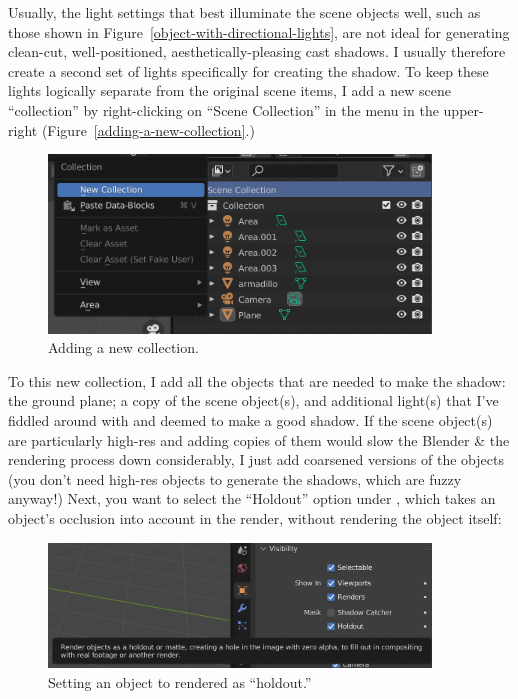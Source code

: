 \documentclass[10pt]{article}
\begin{document}
Usually, the light settings that best illuminate the scene objects well, such as those shown in Figure~\ref{object-with-directional-lights}, are not ideal for generating clean-cut, well-positioned, aesthetically-pleasing cast shadows. I usually therefore create a second set of lights specifically for creating the shadow. To keep these lights logically separate from the original scene items, I add a new scene ``collection'' by right-clicking on ``Scene Collection'' in the  menu in the upper-right (Figure~\ref{adding-a-new-collection}.)
\begin{figure}[H]
    \centering
    \includegraphics[width=4in]{images/adding-a-new-collection.png}
    \caption{Adding a new collection.}
    \label{fig:adding-a-new-collection}
\end{figure}
To this new collection, I add all the objects that are needed to make the shadow: the ground plane; a copy of the scene object(s), and additional light(s) that I've fiddled around with and deemed to make a good shadow. If the scene object(s) are particularly high-res and adding copies of them would slow the Blender \& the rendering process down considerably, I just add coarsened versions of the objects (you don't need high-res objects to generate the shadows, which are fuzzy anyway!) Next, you want to select the ``Holdout'' option under , which takes an object's occlusion into account in the render, without rendering the object itself:
\begin{figure}[H]
    \centering
    \includegraphics[width=4in]{images/holdout.png}
    \caption{Setting an object to rendered as ``holdout.''}
    \label{fig:holdout}
\end{figure}
\end{document}
